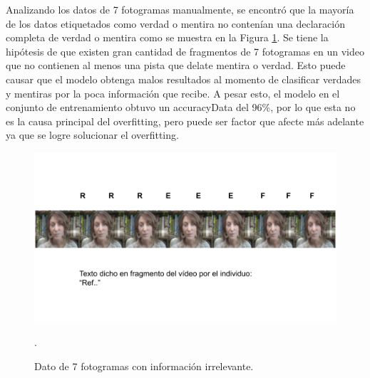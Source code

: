 \begin{onehalfspacing}
Analizando los datos de 7 fotogramas manualmente, se encontró que la mayoría de los datos etiquetados como verdad o mentira no contenían una declaración completa de verdad o mentira como se muestra en la Figura \ref{fig:TextoFragmento7Frames}. Se tiene la hipótesis de que existen gran cantidad de fragmentos de 7 fotogramas en un video que no contienen al menos una pista que delate mentira o verdad. Esto puede causar que el modelo obtenga malos resultados al momento de clasificar verdades y mentiras por la poca información que recibe. A pesar esto, el modelo en el conjunto de entrenamiento obtuvo un accuracyData del 96\%, por lo que esta no es la causa principal del overfitting, pero puede ser factor que afecte más adelante ya que se logre solucionar el overfitting.\\ 

\begin{figure}[th]
	\centering
	\includegraphics[width=14cm,keepaspectratio]{XX_Figures/TextoFragmento7Frames.png}
	\caption{\footnotesize Dato de 7 fotogramas con información irrelevante.}.
	\label{fig:TextoFragmento7Frames}
\end{figure}




\end{onehalfspacing}
